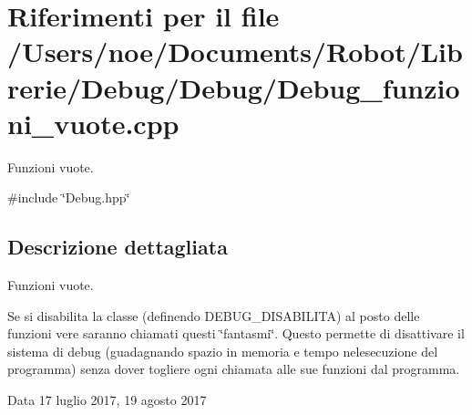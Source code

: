 \section{Riferimenti per il file /\+Users/noe/\+Documents/\+Robot/\+Librerie/\+Debug/\+Debug/\+Debug\+\_\+funzioni\+\_\+vuote.cpp}
\label{_debug__funzioni__vuote_8cpp}


Funzioni vuote.  


{\ttfamily \#include \char`\"{}Debug.\+hpp\char`\"{}}\newline


\subsection{Descrizione dettagliata}
Funzioni vuote. 

Se si disabilita la classe (definendo {\ttfamily D\+E\+B\+U\+G\+\_\+\+D\+I\+S\+A\+B\+I\+L\+I\+TA}) al posto delle funzioni vere saranno chiamati questi \char`\"{}fantasmi\char`\"{}. Questo permette di disattivare il sistema di debug (guadagnando spazio in memoria e tempo nel\textquotesingle{}esecuzione del programma) senza dover togliere ogni chiamata alle sue funzioni dal programma.

\begin{DoxyDate}{Data}
17 luglio 2017, 19 agosto 2017 
\end{DoxyDate}
